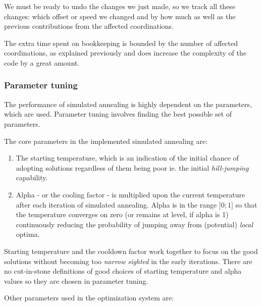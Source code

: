 We must be ready to undo the changes we just made, so we track all these changes: which offset or speed we changed and by how much as well as the previous contributions from the affected coordinations.

The extra time spent on bookkeeping is bounded by the number of affected coordinations, as explained previously and does increase the complexity of the code by a great amount.

\subsubsection{Parameter tuning}
The performance of simulated annealing is highly dependent on the parameters, which are used. Parameter tuning involves finding the best possible set of parameters. 

The core parameters in the implemented simulated annealing are:
\begin{enumerate}
\item The starting temperature, which is an indication of the initial chance of adopting solutions regardless of them being poor ie. the initial \textit{hill-jumping} capability.
\item Alpha - or the cooling factor - is multiplied upon the current temperature after each iteration of simulated annealing. Alpha is in the range $]0;1]$ so that the temperature converges on zero (or remains at level, if alpha is 1) continuously reducing the probability of jumping away from (potential) \textit{local} optima.
\end{enumerate}

Starting temperature and the cooldown factor work together to focus on the good solutions without becoming too \textit{narrow sighted} in the early iterations. There are no cut-in-stone definitions of good choices of starting temperature and alpha values so they are chosen in parameter tuning.

Other parameters used in the optimization system are:

